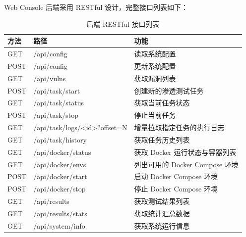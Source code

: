 \label{app:api}

Web Console 后端采用 RESTful 设计，完整接口列表如下：

\begin{table}[htbp]
\centering
\caption{后端 RESTful 接口列表}\label{tab:app:api}
  \renewcommand{\arraystretch}{1.3}
\begin{tabular}{lll}
    \toprule
\textbf{方法} & \textbf{路径} & \textbf{功能} \\
    \midrule
GET  & /api/config                     & 读取系统配置 \\
    \midrule
POST & /api/config                     & 更新系统配置 \\
    \midrule
GET  & /api/vulns                      & 获取漏洞列表 \\
    \midrule
POST & /api/task/start                 & 创建新的渗透测试任务 \\
    \midrule
GET  & /api/task/status                & 获取当前任务状态 \\
    \midrule
POST & /api/task/stop                  & 停止当前任务 \\
    \midrule
GET  & /api/task/logs/<id>?offset=N    & 增量拉取指定任务的执行日志 \\
    \midrule
GET  & /api/task/history               & 获取任务历史列表 \\
    \midrule
GET  & /api/docker/status              & 获取 Docker 运行状态与容器列表 \\
    \midrule
GET  & /api/docker/envs                & 列出可用的 Docker Compose 环境 \\
    \midrule
POST & /api/docker/start               & 启动 Docker Compose 环境 \\
    \midrule
POST & /api/docker/stop                & 停止 Docker Compose 环境 \\
    \midrule
GET  & /api/results                    & 获取测试结果列表 \\
    \midrule
GET  & /api/results/stats              & 获取统计汇总数据 \\
    \midrule
GET  & /api/system/info                & 获取系统运行信息 \\
    \bottomrule
\end{tabular}
\end{table}

\label{app:structure}

